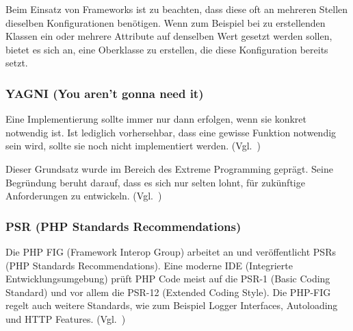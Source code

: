Beim Einsatz von Frameworks ist zu beachten, dass diese oft an mehreren Stellen dieselben Konfigurationen benötigen.
Wenn zum Beispiel bei zu erstellenden Klassen ein oder mehrere Attribute auf denselben Wert gesetzt werden sollen, bietet es sich an, eine Oberklasse zu erstellen, die diese Konfiguration bereits setzt.

\subsubsection{YAGNI (You aren't gonna need it)}
Eine Implementierung sollte immer nur dann erfolgen, wenn sie konkret notwendig ist.
Ist lediglich vorhersehbar, dass eine gewisse Funktion notwendig sein wird, sollte sie noch nicht implementiert werden.
(Vgl.~\cite{extreme-programming-installed})

Dieser Grundsatz wurde im Bereich des Extreme Programming geprägt.
Seine Begründung beruht darauf, dass es sich nur selten lohnt, für zukünftige Anforderungen zu entwickeln.
(Vgl.~\cite{kiss-principle-explained})

\subsubsection{PSR (PHP Standards Recommendations)}
Die PHP FIG (Framework Interop Group) arbeitet an und veröffentlicht PSRs (PHP Standards Recommendations).
Eine moderne IDE (Integrierte Entwicklungsumgebung) prüft PHP Code meist auf die PSR-1 (Basic Coding Standard) und vor allem die PSR-12 (Extended Coding Style).
Die PHP-FIG regelt auch weitere Standards, wie zum Beispiel Logger Interfaces, Autoloading und HTTP Features.
(Vgl.~\cite{psr})

